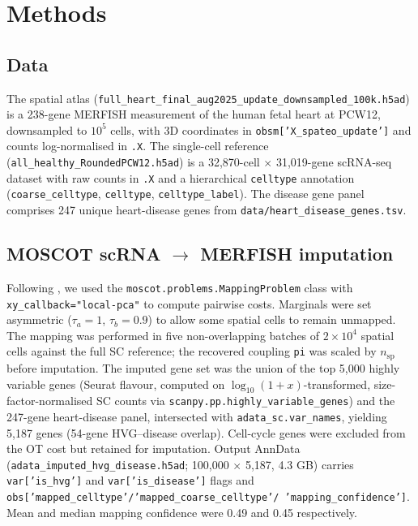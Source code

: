 \documentclass[11pt,a4paper]{article}
\begin{document}
\section{Methods}

\subsection*{Data}
The spatial atlas (\texttt{full\_heart\_final\_aug2025\_update\_downsampled\_100k.h5ad}) is a 238-gene
MERFISH measurement of the human fetal heart at PCW12, downsampled to
$10^5$ cells, with 3D coordinates in
\texttt{obsm['X\_spateo\_update']} and counts log-normalised in
\texttt{.X}. The single-cell reference
(\texttt{all\_healthy\_RoundedPCW12.h5ad}) is a 32{,}870-cell
$\times$ 31{,}019-gene scRNA-seq dataset with raw counts in
\texttt{.X} and a hierarchical \texttt{celltype} annotation
(\texttt{coarse\_celltype}, \texttt{celltype}, \texttt{celltype\_label}).
The disease gene panel comprises 247 unique heart-disease genes from
\texttt{data/heart\_disease\_genes.tsv}.

\subsection*{MOSCOT scRNA $\to$ MERFISH imputation}
Following \citet{klein2025moscot}, we used the
\texttt{moscot.problems.MappingProblem} class with
\texttt{xy\_callback="local-pca"} to compute pairwise costs. Marginals
were set asymmetric ($\tau_a{=}1$, $\tau_b{=}0.9$) to allow some
spatial cells to remain unmapped. The mapping was performed
in five non-overlapping batches of $2 \times 10^4$ spatial cells
against the full SC reference; the recovered coupling
\texttt{pi} was scaled by $n_{\text{sp}}$ before imputation. The
imputed gene set was the union of the top 5{,}000 highly variable
genes (Seurat flavour, computed on $\log_{10}(1+x)$-transformed,
size-factor-normalised SC counts via \texttt{scanpy.pp.highly\_variable\_genes})
and the 247-gene heart-disease panel, intersected with
\texttt{adata\_sc.var\_names}, yielding 5{,}187 genes (54-gene HVG--disease
overlap). Cell-cycle genes were excluded from the OT cost but retained
for imputation. Output AnnData
(\texttt{adata\_imputed\_hvg\_disease.h5ad}; 100{,}000 $\times$ 5{,}187,
4.3 GB) carries \texttt{var['is\_hvg']} and \texttt{var['is\_disease']}
flags and \texttt{obs['mapped\_celltype'/'mapped\_coarse\_celltype'/
'mapping\_confidence']}. Mean and median mapping confidence were 0.49
and 0.45 respectively.
\end{document}
